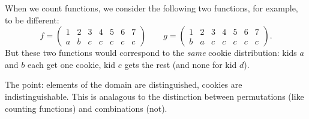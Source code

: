 \documentclass[10pt,]{book}
\theoremstyle{plain}
\theoremstyle{definition}
\theoremstyle{definition}
\theoremstyle{definition}
\numberwithin{equation}{chapter}
\newcommand{\twoline}[2]{\begin{pmatrix}#1 \\ #2 \end{pmatrix}}
\newcommand{\amp}{ & }
\begin{document}
    When we count functions, we consider the following two functions, for example, to be different:
    \begin{equation*}
      f = \twoline{1 \amp 2 \amp 3 \amp 4\amp 5 \amp 6 \amp 7}{a \amp b \amp c \amp c \amp c \amp c \amp c}  \qquad g = \twoline{1 \amp 2 \amp 3 \amp 4\amp 5 \amp 6 \amp 7}{b \amp a \amp c \amp c \amp c \amp c \amp c}.
    \end{equation*}
    But these two functions would correspond to the \emph{same} cookie distribution: kids \(a\) and \(b\) each get one cookie, kid \(c\) gets the rest (and none for kid \(d\)).
\par
 The point: elements of the domain are distinguished, cookies are indistinguishable.  This is analagous to the distinction between permutations (like counting functions) and combinations (not).
\typeout{************************************************}
\typeout{************************************************}
\end{document}
